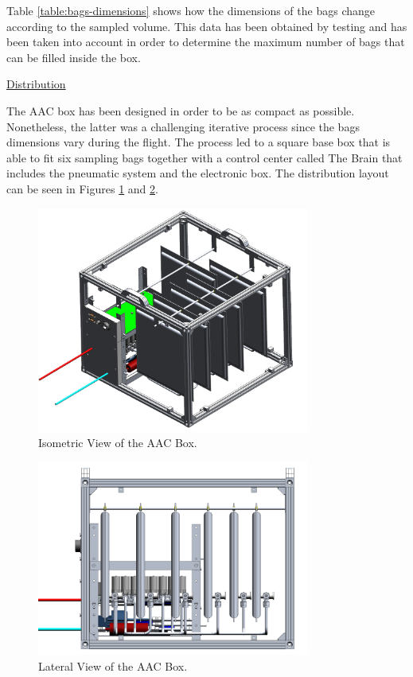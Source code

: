 Table \ref{table:bags-dimensions} shows how the dimensions of the bags change according to the sampled volume. This data has been obtained by testing and has been taken into account in order to determine the maximum number of bags that can be filled inside the box.



\pagebreak
\underline{Distribution}

The AAC box has been designed in order to be as compact as possible. Nonetheless, the latter was a challenging iterative process since the bags dimensions vary during the flight. The process led to a square base box that is able to fit six sampling bags together with a control center called The Brain that includes the pneumatic system and the electronic box. The distribution layout can be seen in Figures \ref{iso_aac} and \ref{lateral_aac}.


\begin{figure}[H]
    \centering
    \includegraphics[width=0.8\textwidth]{4-experiment-design/img/Mechanical/AAC_isometric_view.png}
    \caption{Isometric View of the AAC Box.}
    \label{iso_aac}
\end{figure}


\begin{figure}[H]
    \centering
    \includegraphics[width=0.8\textwidth]{4-experiment-design/img/Mechanical/AAC_lateral_view.png}
    \caption{Lateral View of the AAC Box.}
    \label{lateral_aac}
\end{figure}


